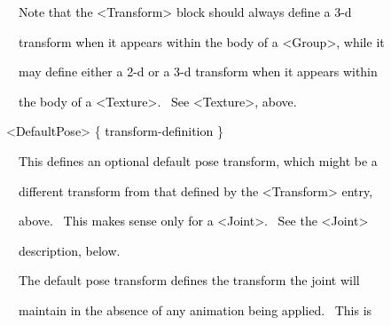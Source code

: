 \documentclass[a4paper]{article}
\newcommand\textstyleOOoComputerKeyWord[1]{\textrm{\textcolor[rgb]{0.0,0.0,0.5019608}{#1}}}
\newcommand\textstyleOOoAssemblerSpecialChar[1]{\textrm{\textcolor[rgb]{0.0,0.5019608,0.0}{#1}}}
\newcommand\textstyleOOoAssemblerIdent[1]{\textrm{\textcolor{black}{#1}}}
\begin{document}
\bigskip

{\color{black}
\textstyleOOoComputerKeyWord{\textcolor{black}{\ \ \ \ Note that the {\textless}Transform{\textgreater} block should
always define a 3-d}}}

{\color{black}
\textstyleOOoComputerKeyWord{\textcolor{black}{\ \ \ \ transform when it appears within the body of a
{\textless}Group{\textgreater}, while it}}}

{\color{black}
\textstyleOOoComputerKeyWord{\textcolor{black}{\ \ \ \ may define either a 2-d or a 3-d transform when it appears
within}}}

{\color{black}
\textstyleOOoComputerKeyWord{\textcolor{black}{\ \ \ \ the body of a {\textless}Texture{\textgreater}. \ See
{\textless}Texture{\textgreater}, above.}}}


\bigskip

{\color{black}
\textstyleOOoComputerKeyWord{\textcolor{black}{\ \ }}\textstyleOOoAssemblerSpecialChar{{\textless}}\textstyleOOoAssemblerIdent{DefaultPose}\textstyleOOoAssemblerSpecialChar{{\textgreater}}\textstyleOOoComputerKeyWord{\textcolor{black}{
}}\textstyleOOoAssemblerSpecialChar{\{}\textstyleOOoComputerKeyWord{\textcolor{black}{
}}\textstyleOOoAssemblerIdent{transform}\textstyleOOoAssemblerSpecialChar{{}-}\textstyleOOoAssemblerIdent{definition}\textstyleOOoComputerKeyWord{\textcolor{black}{
}}\textstyleOOoAssemblerSpecialChar{\}}}


\bigskip

{\color{black}
\textstyleOOoComputerKeyWord{\textcolor{black}{\ \ \ \ This defines an optional default pose transform, which might be
a}}}

{\color{black}
\textstyleOOoComputerKeyWord{\textcolor{black}{\ \ \ \ different transform from that defined by the
{\textless}Transform{\textgreater} entry,}}}

{\color{black}
\textstyleOOoComputerKeyWord{\textcolor{black}{\ \ \ \ above. \ This makes sense only for a
{\textless}Joint{\textgreater}. \ See the {\textless}Joint{\textgreater}}}}

{\color{black}
\textstyleOOoComputerKeyWord{\textcolor{black}{\ \ \ \ description, below.}}}


\bigskip

{\color{black}
\textstyleOOoComputerKeyWord{\textcolor{black}{\ \ \ \ The default pose transform defines the transform the joint
will}}}

{\color{black}
\textstyleOOoComputerKeyWord{\textcolor{black}{\ \ \ \ maintain in the absence of any animation being applied. \ This
is}}}
\end{document}
